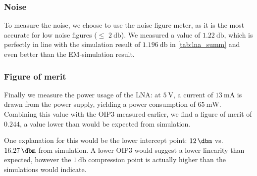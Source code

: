 \documentclass[a4paper]{article}        %
\begin{document}
  \subsubsection{Noise}
  To measure the noise, we choose to use the noise figure meter, as it is the most accurate for low noise figures ($\le$ $\SI{2}{\decibel}$).
  We measured a value of $\SI{1.22}{\decibel}$, which is perfectly in line with the simulation result of $\SI{1.196}{\decibel}$ in \autoref{tab:lna_summ} and even better than the EM-simulation result.

  \subsubsection{Figure of merit}
  Finally we measure the power usage of the LNA: at $\SI{5}{\volt}$, a current of $\SI{13}{\milli\ampere}$ is drawn from the power supply, yielding a power consumption of $\SI{65}{\milli\watt}$.
  Combining this value with the OIP3 measured earlier, we find a figure of merit of $0.244$, a value lower than would be expected from simulation.

  One explanation for this would be the lower intercept point: $\SI{12}{\dbm}$ vs. $\SI{16.27}{\dbm}$ from simulation.
  A lower OIP3 would suggest a lower linearity than expected, however the $\SI{1}{\decibel}$ compression point is actually higher than the simulations would indicate.
\end{document}

